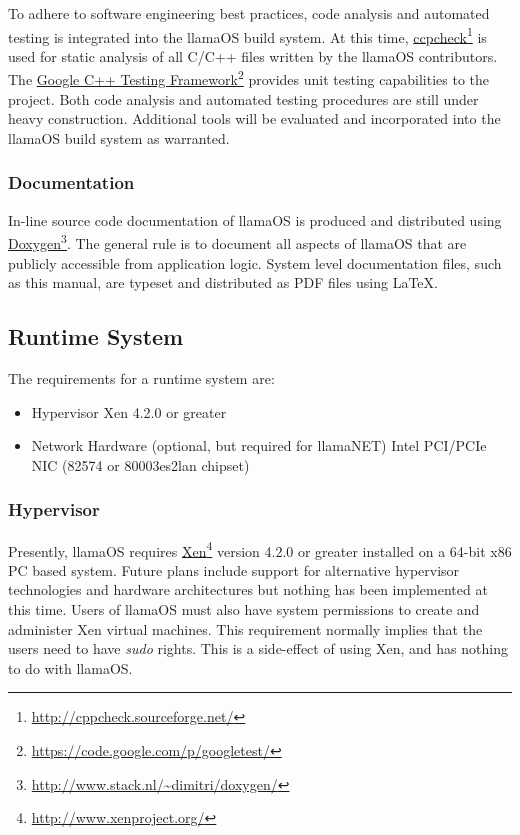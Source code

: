 \documentclass[draft]{article}
\begin{document}
To adhere to software engineering best practices, code analysis and automated 
testing is integrated into the llamaOS build system.  At this time, 
\href{http://cppcheck.sourceforge.net/}{ccpcheck}\footnote{\url{
http://cppcheck.sourceforge.net/}} is used for static analysis of all C/C++ 
files written by the llamaOS contributors.  The 
\href{https://code.google.com/p/googletest/}{Google C++ Testing 
Framework}\footnote{\url{https://code.google.com/p/googletest/}} provides unit 
testing capabilities to the project.  Both code analysis and automated testing 
procedures are still under heavy construction.  Additional tools will be 
evaluated  and incorporated into the llamaOS build system as warranted.  

\subsubsection{Documentation}

In-line source code documentation of llamaOS is produced and distributed using 
\href{http://www.stack.nl/~dimitri/doxygen/}{Doxygen}\footnote{\url{
http://www.stack.nl/~dimitri/doxygen/}}.  The general rule is to document all 
aspects of llamaOS that are publicly accessible from application logic.  System 
level documentation files, such as this manual, are typeset and distributed as 
PDF files using \LaTeX.

\subsection{Runtime System}

The requirements for a runtime system are:

\begin{itemize}
  \item Hypervisor
    \subitem Xen 4.2.0 or greater
  \item Network Hardware (optional, but required for llamaNET)
    \subitem Intel PCI/PCIe NIC (82574 or 80003es2lan chipset)
\end{itemize}

\subsubsection{Hypervisor}

Presently, llamaOS requires 
\href{http://www.xenproject.org/}{Xen}\footnote{\url{http://www.xenproject.org/}
} version 4.2.0 or greater installed on a 64-bit x86 PC based system.  Future 
plans include support for alternative hypervisor technologies and hardware 
architectures but nothing has been implemented at this time.  Users of llamaOS 
must also have system permissions to create and administer Xen virtual 
machines.  This requirement normally implies that the users need to have 
\emph{sudo} rights.  This is a side-effect of using Xen, and has nothing to do 
with llamaOS.
\end{document}
